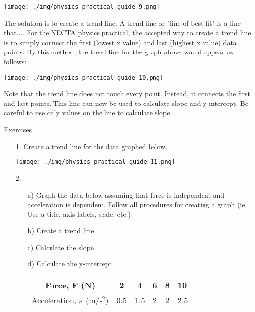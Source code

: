 \begin{center}
\texttt{[image: ./img/physics\_practical\_guide-9.png]}
\end{center}

The solution is to create a trend line. A trend line or "line of best fit" is a line that.... For the NECTA physics practical, the accepted way to create a trend line is to simply connect the first (lowest x value) and last (highest x value) data points. By this method, the trend line for the graph above would appear as follows:

\begin{center}
\texttt{[image: ./img/physics\_practical\_guide-10.png]}
\end{center}

Note that the trend line does not touch every point. Instead, it connects the first and last points. This line can now be used to calculate slope and y-intercept. Be careful to use only values on the line to calculate slope.

Exercises
\begin{enumerate}
\item[1.] Create a trend line for the data graphed below.

\begin{center}
\texttt{[image: ./img/physics\_practical\_guide-11.png]}
\end{center}

\item[2.]
\begin{enumerate}
\item[a)] Graph the data below assuming that force is independent and acceleration is dependent. Follow all procedures for creating a graph (ie. Use a title, axis labels, scale, etc.)
\item[b)] Create a trend line
\item[c)] Calculate the slope
\item[d)] Calculate the y-intercept 

\begin{center}
\begin{tabular}{ | c | c | c | c | c l c l } \hline
Force, F (N) & 2 & 4 & 6 & 8 & 10 \\ \hline
Acceleration, a (m/s$^2$) & 0.5 & 1.5 & 2 & 2 & 2.5 \\ \hline
\end{tabular}
\end{center}
\end{enumerate}
\end{enumerate}

